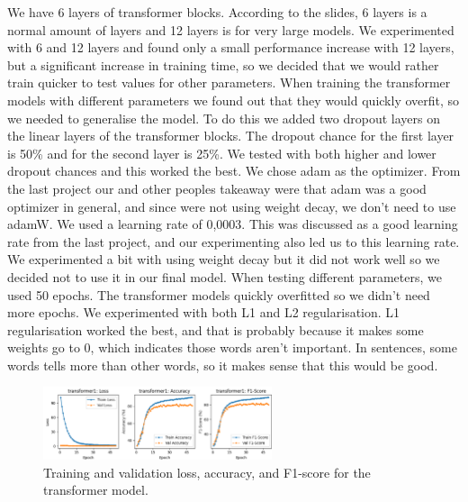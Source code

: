 We have 6 layers of transformer blocks. According to the slides, 6 layers is a normal amount of layers and 12 layers is for very large models. We experimented with 6 and 12 layers and found only a small performance increase with 12 layers, but a significant increase in training time, so we decided that we would rather train quicker to test values for other parameters.
When training the transformer models with different parameters we found out that they would quickly overfit, so we needed to generalise the model. To do this we added two dropout layers on the linear layers of the transformer blocks. The dropout chance for the first layer is 50\% and for the second layer is 25\%. We tested with both higher and lower dropout chances and this worked the best.
We chose adam as the optimizer. From the last project our and other peoples takeaway were that adam was a good optimizer in general, and since were not using weight decay, we don't need to use adamW.
We used a learning rate of 0,0003. This was discussed as a good learning rate from the last project, and our experimenting also led us to this learning rate.
We experimented a bit with using weight decay but it did not work well so we decided not to use it in our final model.
When testing different parameters, we used 50 epochs. The transformer models quickly overfitted so we didn't need more epochs. 
We experimented with both L1 and L2 regularisation. L1 regularisation worked the best, and that is probably because it makes some weights go to 0, which indicates those words aren't important. In sentences, some words tells more than other words, so it makes sense that this would be good.

\begin{figure}[H]
    \vspace*{0.7cm}
    \centering
    \includegraphics[width=0.6\textwidth]{figures/transformer_scores.png}
    \caption{Training and validation loss, accuracy, and F1-score for the transformer model.}
    \label{fig:transformer_scores}
    \vspace*{0.7cm}
\end{figure}

